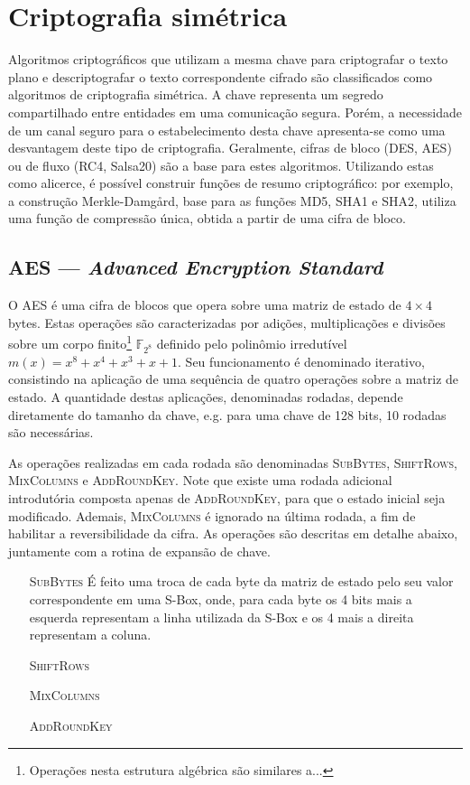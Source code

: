 \documentclass{article}
\begin{document}
\section{Criptografia simétrica}

Algoritmos criptográficos que utilizam a mesma chave para criptografar o
texto plano e descriptografar o texto correspondente cifrado são classificados
como algoritmos de criptografia simétrica. A chave representa um segredo
compartilhado entre entidades em uma comunicação segura. Porém, a necessidade
de um canal seguro para o estabelecimento desta chave apresenta-se como uma
desvantagem deste tipo de criptografia. Geralmente, cifras de bloco (DES, AES)
ou de fluxo (RC4, Salsa20) são a base para estes algoritmos. Utilizando estas
como alicerce, é possível construir funções de resumo criptográfico: por
exemplo, a construção Merkle-Damgård, base para as funções MD5, SHA1 e SHA2,
utiliza uma função de compressão única, obtida a partir de uma cifra de bloco.

\subsection{AES --- \emph{Advanced Encryption Standard}}

O AES é uma cifra de blocos que opera sobre uma matriz de estado de $4 \times 4$ bytes. Estas operações são caracterizadas por adições, multiplicações e divisões sobre um corpo finito\footnote{Operações nesta estrutura algébrica são similares a...}
$\mathbb{F}_{2^{8}}$ definido pelo polinômio irredutível $m(x) = x^{8} + x^{4} + x^{3} + x + 1$. Seu funcionamento é denominado
iterativo, consistindo na aplicação de uma sequência de quatro operações sobre a matriz de estado. A quantidade destas aplicações, denominadas rodadas, depende diretamente do tamanho da chave, e.g. para uma chave de 128 bits, 10 rodadas são necessárias.

As operações realizadas em cada rodada são denominadas \textsc{SubBytes}, \textsc{ShiftRows}, \textsc{MixColumns} e \textsc{AddRoundKey}. Note que existe uma rodada adicional introdutória
composta apenas de \textsc{AddRoundKey}, para que o estado inicial seja modificado. Ademais, \textsc{MixColumns} é ignorado na última rodada, a fim de habilitar a reversibilidade da cifra.
As operações são descritas em detalhe abaixo, juntamente com a rotina de expansão de chave.

\begin{enumerate}
    \item[\textsc{SubBytes}] É feito uma troca de cada byte da matriz de estado pelo seu valor correspondente em uma S-Box, onde, para cada byte os 4 bits mais a esquerda representam a linha utilizada da S-Box e os 4 mais a direita representam a coluna.
    \item[\textsc{ShiftRows}] 
    \item[\textsc{MixColumns}] 
    \item[\textsc{AddRoundKey}] 
\end{enumerate}
\end{document}
